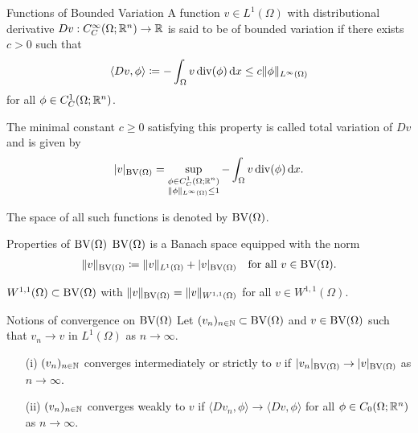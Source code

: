 \begin{frame}{Functions of Bounded Variation}
  A function $v\in L^1(\Omega)$ with distributional derivative
  $Dv:C^{\infty}_C(\Omega;\mathbb{R}^n)\to\mathbb{R}$ is said to be of bounded variation if 
  there exists $c>0$ such that 
  \begin{align*}
    \langle Dv, \phi\rangle\coloneqq -\int_\Omega v\operatorname{div}(\phi)\,\mathrm{d}x\leq
    c\Vert\phi\Vert_{L^\infty(\Omega)}
  \end{align*}
  for all $\phi\in C^1_C(\Omega;\mathbb{R}^n)$.

  \pause  

  The minimal constant $c\geq 0$ satisfying this property is called 
  total variation of $Dv$ and is given by
  \begin{align*}
    |v|_{\textup{BV}(\Omega)} = \sup_{\substack{\phi\in C^1_C(\Omega;\mathbb{R}^n)\\
    \Vert\phi\Vert_{L^\infty(\Omega)}\leq 1}}-\int_\Omega v\operatorname{div} (\phi)\,\mathrm{d}x.
  \end{align*}

  \pause

  The space of all such functions is denoted by $\textup{BV}(\Omega)$.
\end{frame}

\begin{frame}{Properties of $\textup{BV}(\Omega)$}
  $\textup{BV}(\Omega)$ is a Banach space equipped with the norm
  \begin{align*}
    \Vert v \Vert_{\textup{BV}(\Omega)} \coloneqq \Vert v\Vert_{L^1(\Omega)} +
    |v|_{\textup{BV}(\Omega)}\quad\text{for all } v\in\textup{BV}(\Omega).
  \end{align*}
  
  \pause
  \medskip
  $W^{1,1}(\Omega)\subset\textup{BV}(\Omega)$ with $\Vert v\Vert_{\textup{BV}(\Omega)}=
  \Vert v\Vert_{W^{1,1}(\Omega)}$ for all $v\in W^{1,1}(\Omega)$.
\end{frame}

\begin{frame}{Notions of convergence on $\textup{BV}(\Omega)$}
  Let $(v_n)_{n\in\mathbb{N}}\subset \textup{BV}(\Omega)$ and $v\in \textup{BV}(\Omega)$ such that
  $v_n\rightarrow v$ in $L^1(\Omega)$ as $n\rightarrow\infty$.
  \pause
  \begin{itemize}
    \item[(i)]
      $(v_n)_{n\in\mathbb{N}}$ converges intermediately or strictly to $v$
      if $|v_n|_{\textup{BV}(\Omega)}\rightarrow |v|_{\textup{BV}(\Omega)}$ as
      $n\rightarrow\infty$.
      \pause
    \item[(ii)] $(v_n)_{n\in\mathbb{N}}$ converges weakly to
      $v$ if
      $\langle Dv_n,\phi\rangle\rightarrow \langle Dv,\phi\rangle$ 
      for all $\phi\in C_0(\Omega;\mathbb{R}^n)$ as 
      $n\rightarrow\infty$.
  \end{itemize}
\end{frame}

